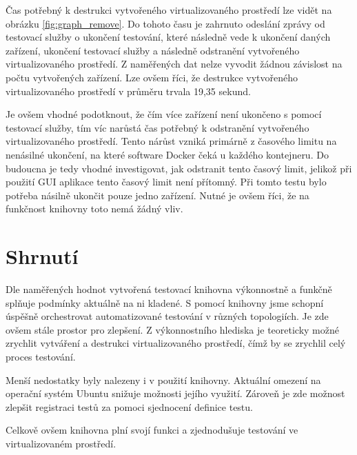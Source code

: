 Čas potřebný k destrukci vytvořeného virtualizovaného prostředí lze vidět na obrázku \ref{fig:graph_remove}. Do tohoto času je zahrnuto odeslání zprávy od testovací služby o ukončení testování, které následně vede k ukončení daných zařízení, ukončení testovací služby a následně odstranění vytvořeného virtualizovaného prostředí. Z naměřených dat nelze vyvodit žádnou závislost na počtu vytvořených zařízení. Lze ovšem říci, že destrukce vytvořeného virtualizovaného prostředí v průměru trvala 19,35 sekund. 

Je ovšem vhodné podotknout, že čím více zařízení není ukončeno s pomocí testovací služby, tím víc narůstá čas potřebný k odstranění vytvořeného virtualizovaného prostředí. Tento nárůst vzniká primárně z časového limitu na nenásilné ukončení, na které software Docker čeká u každého kontejneru. Do budoucna je tedy vhodné investigovat, jak odstranit tento časový limit, jelikož při použití GUI aplikace tento časový limit není přítomný. Při tomto testu bylo potřeba násilně ukončit pouze jedno zařízení. Nutné je ovšem říci, že na funkčnost knihovny toto nemá žádný vliv.

\section{Shrnutí}

Dle naměřených hodnot vytvořená testovací knihovna výkonnostně a funkčně splňuje podmínky aktuálně na ni kladené. S pomocí knihovny jsme schopní úspěšně orchestrovat automatizované testování v různých topologiích. Je zde ovšem stále prostor pro zlepšení. Z výkonnostního 
hlediska je teoreticky možné zrychlit vytváření a destrukci virtualizovaného prostředí, čímž by se zrychlil celý proces testování. 

Menší nedostatky byly nalezeny i v použití knihovny. Aktuální omezení na operační systém Ubuntu snižuje možnosti jejího využití. Zároveň je zde možnost zlepšit registraci testů za pomoci sjednocení definice testu. 

Celkově ovšem knihovna plní svojí funkci a zjednodušuje testování ve virtualizovaném prostředí.

\clearpage

